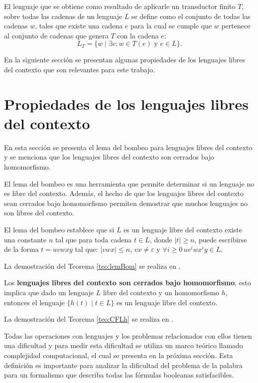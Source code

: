 El lenguaje que se obtiene como resultado de aplicarle un transductor finito $T$, sobre todas las cadenas de un lenguaje $L$ se define como
el conjunto de todas las cadenas $w$, tales que existe una cadena $e$ para la cual se cumple que $w$ pertenece al conjunto de cadenas
que genera $T$ con la cadena $e$:
$$L_T=\{w\mid \exists e: w\in T(e) \text{ y }e\in L\}.$$

En la siguiente sección se presentan algunas propiedades de los lenguajes libres del contexto que son relevantes para este trabajo.

\section{Propiedades de los lenguajes libres del contexto}

En esta sección se presenta el lema del bombeo para lenguajes libres del contexto y se menciona que los lenguajes libres del contexto son cerrados bajo homomorfismo.

El lema del bombeo es una herramienta
que permite determinar si un lenguaje no es libre del contexto. Además,
el hecho de que los lenguajes libres del contexto sean cerrados bajo homomorfismo permiten
demostrar que muchos lenguajes no son libres del contexto.

\begin{theorem}
  \label{teo:lemBom}
  El lema del bombeo establece que si $L$ es un lenguaje libre del contexto
  existe una constante $n$ tal que para toda cadena $t\in L$, donde $|t|\geq n$, puede escribirse de la forma $t=uvwxy$ tal que:
  $|vwx|\leq n$, $vx\neq \varepsilon$ y $\forall i\geq 0\,uv^iwx^iy\in L$.  
\end{theorem}

La demostración del Teorema \ref{teo:lemBom} se realiza en \cite{authomataTheory}.

\begin{theorem}
  \label{teo:CFLh}
  Los \textbf{lenguajes libres del contexto son cerrados bajo homomorfismo}, esto
  implica que dado un lenguaje $L$ libre del contexto y un homomorfismo $h$, entonces el lenguaje
  $\{h(t)\mid t\in L\}$ es un lenguaje libre del contexto.  
\end{theorem}

La demostración del Teorema \ref{teo:CFLh} se realiza en \cite{authomataTheory}.

Todas las operaciones con lenguajes y los problemas relacionados con ellos tienen una dificultad y para medir esta dificultad
se utiliza un marco teórico llamado complejidad computacional, el cual se presenta en la próxima sección. Esta definición
es importante para analizar la dificultad del problema de la palabra para un formalismo que describa todas las fórmulas booleanas
satisfacibles.

